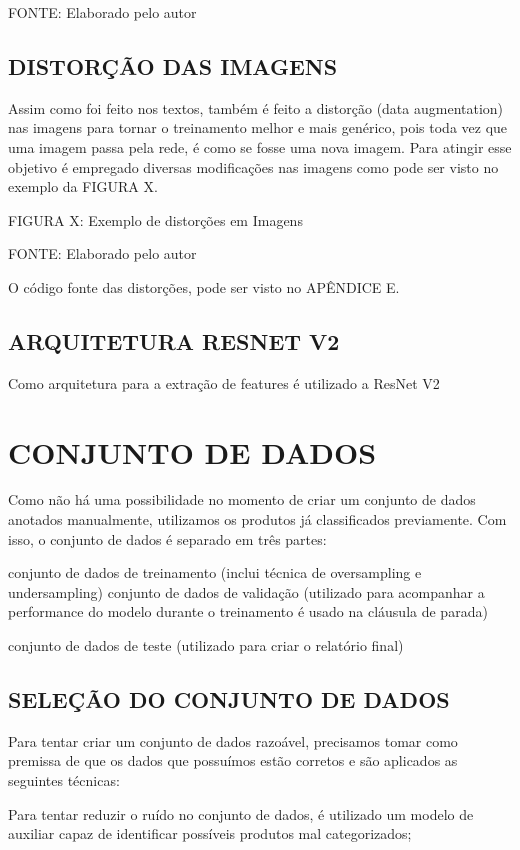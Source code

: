 FONTE: Elaborado pelo autor


\subsection{DISTORÇÃO DAS IMAGENS}

Assim como foi feito nos textos, também é feito a distorção (data augmentation) nas imagens para tornar o treinamento melhor e mais genérico, pois toda vez que uma imagem passa pela rede, é como se fosse uma nova imagem. Para atingir esse objetivo é empregado diversas modificações nas imagens como pode ser visto no exemplo da FIGURA X.

FIGURA X: Exemplo de distorções em Imagens

FONTE: Elaborado pelo autor

O código fonte das distorções, pode ser visto no APÊNDICE E.

\subsection{ARQUITETURA RESNET V2}

Como arquitetura para a extração de features é utilizado a ResNet V2 

\section{CONJUNTO DE DADOS}
Como não há uma possibilidade no momento de criar um conjunto de dados anotados manualmente, utilizamos os produtos já classificados previamente.     Com isso, o conjunto de dados é separado em três partes:

conjunto de dados de treinamento (inclui técnica de oversampling e undersampling)
conjunto de dados de validação (utilizado para acompanhar a performance do modelo durante o treinamento é usado na cláusula de parada)

conjunto de dados de teste (utilizado para criar o relatório final)

\subsection{SELEÇÃO DO CONJUNTO DE DADOS}

Para tentar criar um conjunto de dados razoável, precisamos tomar como premissa de que os dados que possuímos estão corretos e são aplicados as seguintes técnicas:

Para tentar reduzir o ruído no conjunto de dados, é utilizado um modelo de auxiliar capaz de identificar possíveis produtos mal categorizados;

